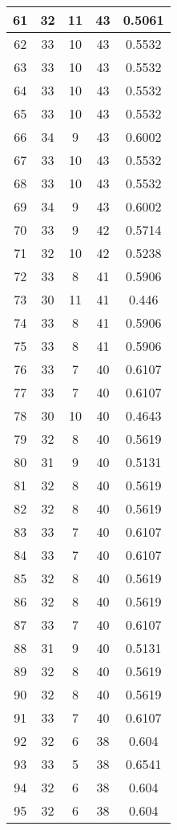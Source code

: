 \documentclass[letterpaper, 12pt]{article}
\begin{document}
\begin{longtable}{|c|c|c|c|c|}
\hline
61 & 32 & 11 & 43 & 0.5061 \\
\hline
62 & 33 & 10 & 43 & 0.5532 \\
\hline
63 & 33 & 10 & 43 & 0.5532 \\
\hline
64 & 33 & 10 & 43 & 0.5532 \\
\hline
65 & 33 & 10 & 43 & 0.5532 \\
\hline
66 & 34 & 9 & 43 & 0.6002 \\
\hline
67 & 33 & 10 & 43 & 0.5532 \\
\hline
68 & 33 & 10 & 43 & 0.5532 \\
\hline
69 & 34 & 9 & 43 & 0.6002 \\
\hline
70 & 33 & 9 & 42 & 0.5714 \\
\hline
71 & 32 & 10 & 42 & 0.5238 \\
\hline
72 & 33 & 8 & 41 & 0.5906 \\
\hline
73 & 30 & 11 & 41 & 0.446 \\
\hline
74 & 33 & 8 & 41 & 0.5906 \\
\hline
75 & 33 & 8 & 41 & 0.5906 \\
\hline
76 & 33 & 7 & 40 & 0.6107 \\
\hline
77 & 33 & 7 & 40 & 0.6107 \\
\hline
78 & 30 & 10 & 40 & 0.4643 \\
\hline
79 & 32 & 8 & 40 & 0.5619 \\
\hline
80 & 31 & 9 & 40 & 0.5131 \\
\hline
81 & 32 & 8 & 40 & 0.5619 \\
\hline
82 & 32 & 8 & 40 & 0.5619 \\
\hline
83 & 33 & 7 & 40 & 0.6107 \\
\hline
84 & 33 & 7 & 40 & 0.6107 \\
\hline
85 & 32 & 8 & 40 & 0.5619 \\
\hline
86 & 32 & 8 & 40 & 0.5619 \\
\hline
87 & 33 & 7 & 40 & 0.6107 \\
\hline
88 & 31 & 9 & 40 & 0.5131 \\
\hline
89 & 32 & 8 & 40 & 0.5619 \\
\hline
90 & 32 & 8 & 40 & 0.5619 \\
\hline
91 & 33 & 7 & 40 & 0.6107 \\
\hline
92 & 32 & 6 & 38 & 0.604 \\
\hline
93 & 33 & 5 & 38 & 0.6541 \\
\hline
94 & 32 & 6 & 38 & 0.604 \\
\hline
95 & 32 & 6 & 38 & 0.604 \\

\end{longtable}
\end{document}
